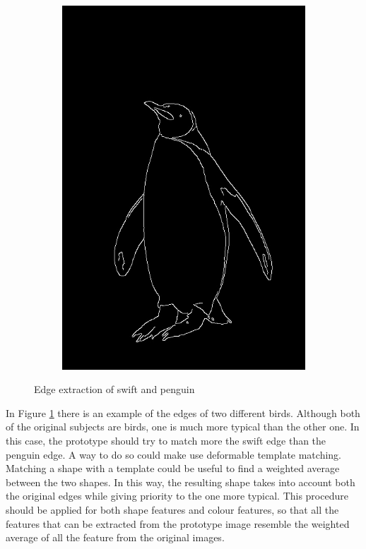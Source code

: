 \documentclass[conference]{IEEEtran}
\begin{document}
\begin{figure}[!t]
\begin{subfigure}[!t]{0.48\linewidth}
					\centerline{\includegraphics[height=0.4\textheight]{imgs/penguin_edges.jpg}}
				\end{subfigure}
				\caption{Edge extraction of swift and penguin}
				\label{fig:8}
			\end{figure}
		
		\noindent In Figure \ref{fig:8} there is an example of the edges of two different birds. Although both of the original 
		subjects are birds, one is much more typical than the other one. In this case, the prototype should try to match more the swift edge than the penguin edge. A way to do so could make use deformable 
		template matching. Matching a shape with a template could be useful to find a weighted average between the two shapes. In this way, the resulting shape takes into account both the original edges while 
		giving priority to the one more typical.
		This procedure should be applied for both shape features and colour features, so that all the features that can be extracted from the prototype image resemble the weighted average of all the feature from 
		the original images. 
\end{document}
